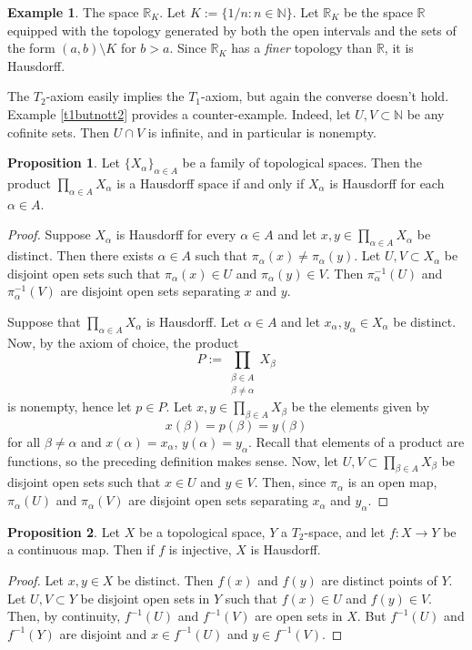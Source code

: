 \documentclass{book}
\theoremstyle{definition}
\newtheorem{proposition}{Proposition}[section]
\newtheorem{example}{Example}[section]
\theoremstyle{remark}
\newcommand{\R}{\mathbb{R}}
\newcommand{\N}{\mathbb{N}}
\begin{document}
\begin{example}
\label{t2butnotregular}
The space $\R_K$. Let $K:=\{1/n:n\in\N\}$. Let $\R_K$ be the space $\R$ equipped with the topology generated by both the open intervals and the sets of the form $(a,b)\setminus K$ for $b>a$. Since $\R_K$ has a \textit{finer} topology than $\R$, it is Hausdorff.
\end{example}

The $T_2$-axiom easily implies the $T_1$-axiom, but again the converse doesn't hold. Example \ref{t1butnott2} provides a counter-example. Indeed, let $U,V\subset\N$ be any cofinite sets. Then $U\cap V$ is infinite, and in particular is nonempty.

\begin{proposition}
Let $\{X_\alpha\}_{\alpha\in A}$ be a family of topological spaces. Then the product $\prod_{\alpha\in A}X_\alpha$ is a Hausdorff space if and only if $X_\alpha$ is Hausdorff for each $\alpha\in A$.
\end{proposition}
\begin{proof}
Suppose $X_\alpha$ is Hausdorff for every $\alpha\in A$ and let $x,y\in\prod_{\alpha\in A}X_\alpha$ be distinct. Then there exists $\alpha\in A$ such that $\pi_\alpha(x)\neq\pi_\alpha(y)$. Let $U,V\subset X_\alpha$ be disjoint open sets such that $\pi_\alpha(x)\in U$ and $\pi_\alpha(y)\in V$. Then $\pi_\alpha^{-1}(U)$ and $\pi^{-1}_\alpha(V)$ are disjoint open sets separating $x$ and $y$.

Suppose that $\prod_{\alpha\in A}X_\alpha$ is Hausdorff. Let $\alpha\in A$ and let $x_\alpha,y_\alpha\in X_\alpha$ be distinct. Now, by the axiom of choice, the product
$$P:=\prod_{\substack{\beta\in A\\\beta\neq\alpha}}X_\beta$$
is nonempty, hence let $p\in P$. Let $x,y\in\prod_{\beta\in A}X_\beta$ be the elements given by $$x(\beta)=p(\beta)=y(\beta)$$ for all $\beta\neq\alpha$ and $x(\alpha)=x_\alpha$, $y(\alpha)=y_\alpha$. Recall that elements of a product are functions, so the preceding definition makes sense. Now, let $U,V\subset\prod_{\beta\in A}X_\beta$ be disjoint open sets such that $x\in U$ and $y\in V$. Then, since $\pi_\alpha$ is an open map, $\pi_\alpha(U)$ and $\pi_\alpha(V)$ are disjoint open sets separating $x_\alpha$ and $y_\alpha$.
\end{proof}

\begin{proposition}
Let $X$ be a topological space, $Y$ a $T_2$-space, and let $f:X\to Y$ be a continuous map. Then if $f$ is injective, $X$ is Hausdorff.
\end{proposition}
\begin{proof}
Let $x,y\in X$ be distinct. Then $f(x)$ and $f(y)$ are distinct points of $Y$. Let $U,V\subset Y$ be disjoint open sets in $Y$ such that $f(x)\in U$ and $f(y)\in V$. Then, by continuity, $f^{-1}(U)$ and $f^{-1}(V)$ are open sets in $X$. But $f^{-1}(U)$ and $f^{-1}(Y)$ are disjoint and $x\in f^{-1}(U)$ and $y\in f^{-1}(V)$.
\end{proof}
\end{document}
